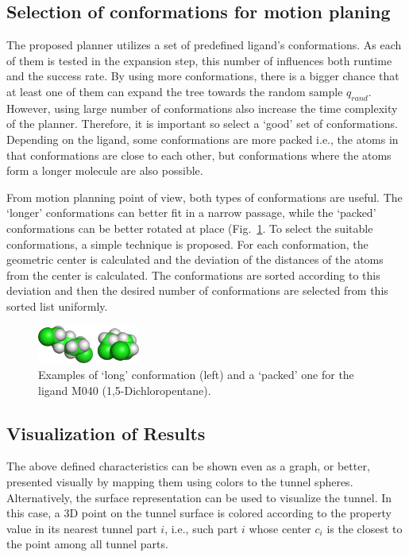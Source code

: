 \documentclass[usletter, 10pt, conference]{ieeeconf} %
\def\qrand{q_{rand}}
\begin{document}
\subsection{Selection of conformations for motion planing}
\label{sec::strat}

The proposed planner utilizes a set of predefined ligand's conformations.
As each of them is tested in the expansion step, this number of influences both runtime and the success rate.
By using more conformations, there is a bigger chance that at least one of them can expand the tree towards the random sample $\qrand$.
However, using large number of conformations also increase the time complexity of the planner.
Therefore, it is important so select a `good' set of conformations.
Depending on the ligand, some conformations are more packed i.e., the atoms in that conformations are close to each other, but 
conformations where the atoms form a longer molecule are also possible.

From motion planning point of view, both types of conformations are useful.
The `longer' conformations can better fit in a narrow passage, while the `packed' conformations can be better rotated at place 
(Fig.~\ref{fig::m040c}.
To select the suitable conformations, a simple technique is proposed.  
For each conformation, the geometric center is calculated and the deviation of the distances of the atoms from the center is calculated.
The conformations are sorted according to this deviation and then the desired number of conformations are selected from this sorted list uniformly.

\begin{figure}
\centering
\includegraphics[width=0.3\textwidth]{fig/m040-conformations}
\caption{\label{fig::m040c}
 Examples of `long' conformation (left) and a `packed' one for the ligand M040 (1,5-Dichloropentane).
}
\end{figure}


\subsection{Visualization of Results}

The above defined characteristics can be shown even as a graph, or better, presented visually by mapping them using colors to the tunnel spheres.
 Alternatively, the surface representation can be used to visualize the tunnel.
In this case, a 3D point on the tunnel surface is colored according to the property value in its nearest tunnel part $i$,  i.e., such part $i$ whose center $c_i$ is the closest to the point among all tunnel parts.
\end{document}
